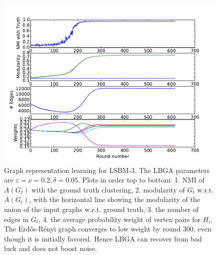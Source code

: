\documentclass{article}
\newcommand{\er}{Erd\H{o}s-R\'{e}nyi }
\begin{document}
\begin{figure}
\includegraphics[width=0.5\columnwidth]{figures/LBM-SNR=6+ER-consistentNO+NEF.pdf}
\caption{Graph representation learning for LSBM-3. The LBGA parameters are
$\varepsilon=\nu=0.2, \delta=0.05$. Plots in order top to bottom: 1. NMI of
$A(G_t)$ with the ground truth clustering, 2. modularity of $G_t$ w.r.t.
$A(G_t)$, with the horizontal line showing the modularity of the union of the
input graphs w.r.t. ground truth, 3. the number of edges in $G_t$, 4.  the
average probability weight of vertex pairs for $H_i$.  The \er graph converges
to low weight by round 300, even though it is initially favored. Hence
LBGA can recover from bad luck and does not boost noise.} 
\label{fig:local-sbm} 
\end{figure}
\end{document}
